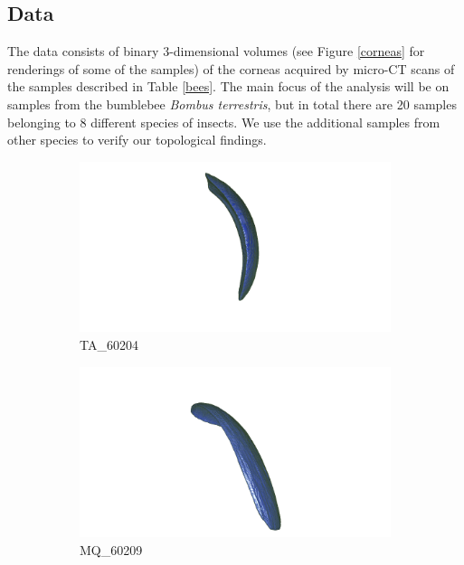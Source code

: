 \subsection{Data}
The data consists of binary 3-dimensional volumes (see Figure \ref{corneas} for renderings of some of the samples) of the corneas acquired by micro-CT scans of the samples described in Table \ref{bees}. The main focus of the analysis will be on samples from the bumblebee \textit{Bombus terrestris}, but in total there are 20 samples belonging to 8 different species of insects. We use the additional samples from other species to verify our topological findings.
\begin{figure}[h]
  \centering
  \begin{subfigure}{.3 \linewidth}
  \centering
  \includegraphics[scale=0.2]{ta60204_cornea.png}
  \caption{TA\_60204}
  \end{subfigure}%
  \begin{subfigure}{.3 \linewidth}
  \centering
  \includegraphics[scale=0.2]{mq60209_cornea.png}
  \caption{MQ\_60209}
  \end{subfigure}%
  \begin{subfigure}{.3 \linewidth}

\end{subfigure}
\end{figure}
